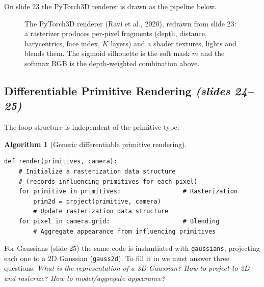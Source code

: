 \documentclass[11pt,a4paper]{article}
\newcommand{\sr}[1]{\texorpdfstring{\emph{(#1)}}{(#1)}}
\DeclareMathOperator{\sigmoid}{sigmoid}
\theoremstyle{definition}
\newtheorem{algorithm}{Algorithm}[section]
\theoremstyle{plain}
\theoremstyle{remark}
\begin{document}
On slide 23 the PyTorch3D renderer is drawn as the pipeline below.

\begin{figure}[htbp]
\centering
{}
\caption{The PyTorch3D renderer (Ravi et al., 2020), redrawn from slide 23: a rasterizer produces per-pixel fragments (depth, distance, barycentrics, face index, $K$ layers) and a shader textures, lights and blends them. The sigmoid silhouette is the soft mask $m$ and the softmax RGB is the depth-weighted combination above.}
\end{figure}

\subsection{Differentiable Primitive Rendering \sr{slides 24--25}}
The loop structure is independent of the primitive type:
\begin{algorithm}[Generic differentiable primitive rendering]
\begin{lstlisting}
def render(primitives, camera):
    # Initialize a rasterization data structure
    # (records influencing primitives for each pixel)
    for primitive in primitives:                 # Rasterization
        prim2d = project(primitive, camera)
        # Update rasterization data structure
    for pixel in camera.grid:                    # Blending
        # Aggregate appearance from influencing primitives
\end{lstlisting}
\end{algorithm}
For Gaussians (slide 25) the same code is instantiated with \texttt{gaussians}, projecting each one to a 2D Gaussian (\texttt{gauss2d}). To fill it in we must answer three questions: \emph{What is the representation of a 3D Gaussian? How to project to 2D and rasterize? How to model/aggregate appearance?}
\end{document}

